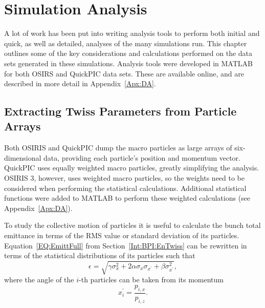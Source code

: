 %
%

\chapter{Simulation Analysis}
\label{Ch:SimA}

A lot of work has been put into writing analysis tools to perform both initial and quick, as well as detailed, analyses of the many simulations run.
This chapter outlines some of the key considerations and calculations performed on the data sets generated in these simulations.
Analysis tools were developed in MATLAB for both OSIRS and QuickPIC data sets.
These are available online, and are described in more detail in Appendix~\ref{Apx:DA}.

\section{Extracting Twiss Parameters from Particle Arrays}
\label{SimA:EnTwiss}

Both OSIRIS and QuickPIC dump the macro particles as large arrays of six-dimensional data, providing each particle's position and momentum vector.
QuickPIC uses equally weighted macro particles, greatly simplifying the analysis.
OSIRIS 3, however, uses weighted macro particles, so the weights need to be considered when performing the statistical calculations.
Additional statistical functions were added to MATLAB to perform these weighted calculations (see Appendix~\ref{Apx:DA}).

To study the collective motion of particles it is useful to calculate the bunch total emittance in terms of the RMS value or standard deviation of its particles.
Equation~\ref{EQ:EmittFull} from Section~\ref{Int:BPI:EnTwiss} can be rewritten in terms of the statistical distributions of its particles such that
\begin{equation}
    \epsilon = \sqrt{\gamma\sigma_{x}^{2} + 2\alpha\sigma_{x}\sigma_{x^{\prime}} + \beta\sigma_{x^{\prime}}^{2}}, \label{EQ:Emitt}
\end{equation}
where the angle of the $i$-th particles can be taken from its momentum
\begin{equation}
    x_{i}^{\prime} = \frac{p_{i,x}}{p_{i,z}}.
\end{equation}

